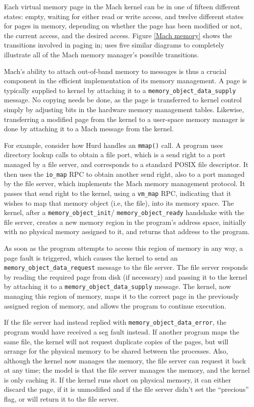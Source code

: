 \documentclass{article}
\def\moinit{{\tt memory_object_init}\xspace}
\def\moready{{\tt memory_object_ready}\xspace}
\def\morequest{{\tt memory_object_data_request}\xspace}
\def\mosupply{{\tt memory_object_data_supply}\xspace}
\def\modataerror{{\tt memory_object_data_error}\xspace}
\begin{document}
Each virtual memory page in the Mach kernel can be in one of fifteen
different states: empty, waiting for either read or write access, and
twelve different states for pages in memory, depending on whether the
page has been modified or not, the current access, and the desired
access.  Figure \ref{Mach memory} shows the transitions involved in
paging in; \cite{principles} uses five similar diagrams to completely
illustrate all of the Mach memory manager's possible transitions.

Mach's ability to attach out-of-band memory to messages is thus a
crucial component in the efficient implementation of its memory
management.  A page is typically supplied to kernel by attaching it to
a \mosupply message.  No copying needs be done, as the
page is transferred to kernel control simply by adjusting bits in the
hardware memory management tables.  Likewise, transferring a modified
page from the kernel to a user-space memory manager is done by
attaching it to a Mach message from the kernel.

For example, consider how Hurd handles an {\tt mmap()} call.  A
program uses directory lookup calls to obtain a file port, which is a
send right to a port managed by a file server, and corresponds to a
standard POSIX file descriptor.  It then uses the {\tt io_map} RPC to
obtain another send right, also to a port managed by the file server,
which implements the Mach memory management protocol.  It passes that
send right to the kernel, using a {\tt vm_map} RPC, indicating that it
wishes to map that memory object (i.e, the file), into its memory
space.  The kernel, after a \moinit / \moready handshake with the file
server, creates a new memory region in the program's address space,
initially with no physical memory assigned to it, and returns that
address to the program.

As soon as the program attempts to access this region of memory in any
way, a page fault is triggered, which causes the kernel to send an
\morequest message to the file server.  The file server responds by
reading the required page from disk (if necessary) and passing it to
the kernel by attaching it to a \mosupply message.  The kernel, now
managing this region of memory, maps it to the correct page in the
previously assigned region of memory, and allows the program to
continue execution.

If the file server had instead replied with \modataerror, the program
would have received a seg fault instead.  If another program maps the
same file, the kernel will not request duplicate copies of the pages,
but will arrange for the physical memory to be shared between the
processes.  Also, although the kernel now manages the memory, the file
server can request it back at any time; the model is that the file
server manages the memory, and the kernel is only caching it.  If the
kernel runs short on physical memory, it can either discard the page,
if it is unmodified and if the file server didn't set the ``precious''
flag, or will return it to the file server.
\end{document}
